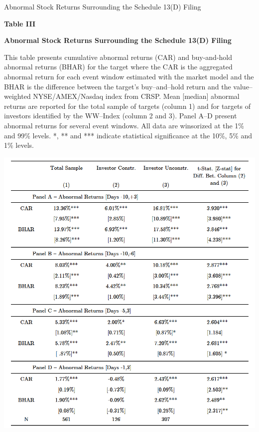\documentclass[12pt]{article}
\begin{document}
\begin{table}[!htbp]
	\centering
	\captionsetup{textformat=empty,labelformat=blank}
	\caption{Abnormal Stock Returns Surrounding the Schedule 13(D) Filing}
	\textbf{Table III}\par\medskip
	\large\textbf{Abnormal Stock Returns Surrounding the Schedule 13(D) Filing}\par\medskip
	\justifying
	\footnotesize\noindent{}This table presents cumulative abnormal returns (CAR) and buy-and-hold abnormal returns (BHAR) for the target where the CAR is the aggregated abnormal return for each event window estimated with the market model and the BHAR is the difference between the target's buy–and–hold return and the value–weighted NYSE/AMEX/Nasdaq index from CRSP. Mean [median] abnormal returns  are reported for the total sample of targets (column 1) and  for targets of investors identified by the WW–Index (column 2 and 3). Panel A--D present abnormal returns for several event windows. All data are winsorized at the 1\% and 99\% levels. *, ** and *** indicate statistical significance at the 10\%, 5\% and 1\% levels.\par\medskip
	\centering													
	\begin{adjustbox}{width=\textwidth}
		\includegraphics{ar_window_final}
	\end{adjustbox}\par\medskip
\end{table}
\end{document}
